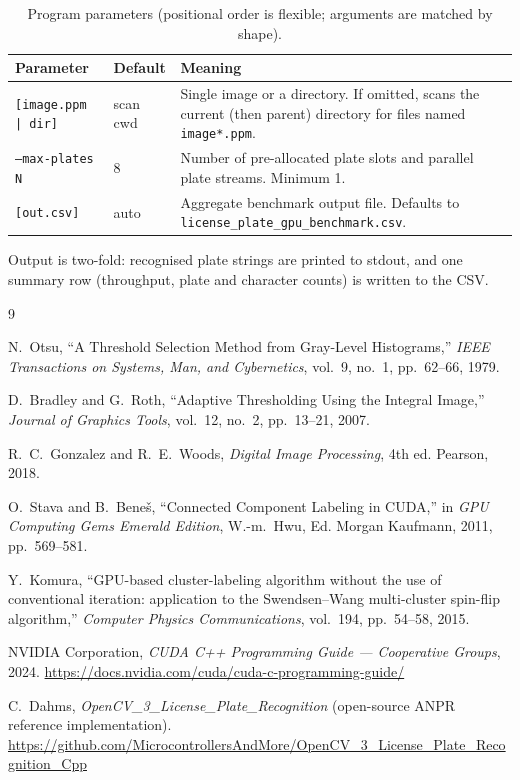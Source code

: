 \begin{table}[H]
\centering
\small
\begin{tabular}{p{3.2cm}p{1.6cm}p{8.0cm}}
\toprule
Parameter & Default & Meaning \\
\midrule
\texttt{[image.ppm | dir]} & scan cwd & Single image or a directory. If omitted, scans the current (then parent) directory for files named \texttt{image*.ppm}. \\
\texttt{--max-plates N}     & 8        & Number of pre-allocated plate slots and parallel plate streams. Minimum 1. \\
\texttt{[out.csv]}          & auto     & Aggregate benchmark output file. Defaults to \texttt{license\_plate\_gpu\_benchmark.csv}. \\
\bottomrule
\end{tabular}
\normalsize
\caption{Program parameters (positional order is flexible; arguments are matched by shape).}
\label{tab:params}
\end{table}

Output is two-fold: recognised plate strings are printed to stdout, and one summary row (throughput, plate and character counts) is written to the CSV.

\begin{thebibliography}{9}

N.~Otsu,
``A Threshold Selection Method from Gray-Level Histograms,''
\emph{IEEE Transactions on Systems, Man, and Cybernetics}, vol.~9, no.~1, pp.~62--66, 1979.

D.~Bradley and G.~Roth,
``Adaptive Thresholding Using the Integral Image,''
\emph{Journal of Graphics Tools}, vol.~12, no.~2, pp.~13--21, 2007.

R.~C.~Gonzalez and R.~E.~Woods,
\emph{Digital Image Processing}, 4th ed.
Pearson, 2018.

O.~Stava and B.~Bene\v{s},
``Connected Component Labeling in CUDA,''
in \emph{GPU Computing Gems Emerald Edition}, W.-m.~Hwu, Ed.
Morgan Kaufmann, 2011, pp.~569--581.

Y.~Komura,
``GPU-based cluster-labeling algorithm without the use of conventional iteration: application to the Swendsen--Wang multi-cluster spin-flip algorithm,''
\emph{Computer Physics Communications}, vol.~194, pp.~54--58, 2015.

NVIDIA Corporation,
\emph{CUDA C++ Programming Guide --- Cooperative Groups}, 2024.
\url{https://docs.nvidia.com/cuda/cuda-c-programming-guide/}

C.~Dahms,
\emph{OpenCV\_3\_License\_Plate\_Recognition} (open-source ANPR reference implementation).
\url{https://github.com/MicrocontrollersAndMore/OpenCV_3_License_Plate_Recognition_Cpp}

\end{thebibliography}
